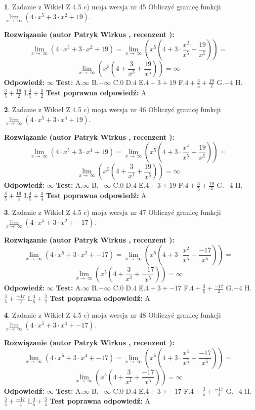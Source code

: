 \documentclass[12pt, a4paper]{article}
\theoremstyle{definition} %
\newtheorem{zad}{}
\newcommand{\zadStart}[1]{\begin{zad}#1\newline}
\newcommand{\zadStop}{\end{zad}}
\newcommand{\rozwStart}[2]{\noindent \textbf{Rozwiązanie (autor #1 , recenzent #2): }\newline}
\newcommand{\rozwStop}{\newline}
\newcommand{\odpStart}{\noindent \textbf{Odpowiedź:}\newline}
\newcommand{\odpStop}{\newline}
\newcommand{\testStart}{\noindent \textbf{Test:}\newline}
\newcommand{\testStop}{\newline}
\newcommand{\kluczStart}{\noindent \textbf{Test poprawna odpowiedź:}\newline}
\newcommand{\kluczStop}{\newline}
\begin{document}
\zadStart{Zadanie z Wikieł Z 4.5 c) moja wersja nr 45}
Obliczyć granicę funkcji  $\lim\limits_{x\to\ \infty}(4 \cdot x^{5}+3 \cdot x^{2}+19)$.
\zadStop
\rozwStart{Patryk Wirkus}{}
$$\lim\limits_{x\to\ \infty}(4 \cdot x^{5}+3 \cdot x^{2}+19) = \lim\limits_{x\to\ \infty}(x^{5}(4 +3 \cdot \frac{x^{2}}{x^{5}}+\frac{19}{x^{5}})) =$$ $$\lim\limits_{x\to\ \infty}(x^{5}(4 +\frac{3}{x^{3}}+\frac{19}{x^{5}})) =\infty$$
\rozwStop
\odpStart
$\infty$
\odpStop
\testStart
A.$\infty$ B.$-\infty$ C.$0$ D.$4$ E.$4 + 3 + 19$
F.$4+\frac{3}{5}+\frac{19}{2}$ G.$-4$
H.$\frac{3}{5}+\frac{19}{2}$
I.$\frac{4}{5}+\frac{3}{2}$
\testStop
\kluczStart
A
\kluczStop



\zadStart{Zadanie z Wikieł Z 4.5 c) moja wersja nr 46}
Obliczyć granicę funkcji  $\lim\limits_{x\to\ \infty}(4 \cdot x^{5}+3 \cdot x^{4}+19)$.
\zadStop
\rozwStart{Patryk Wirkus}{}
$$\lim\limits_{x\to\ \infty}(4 \cdot x^{5}+3 \cdot x^{4}+19) = \lim\limits_{x\to\ \infty}(x^{5}(4 +3 \cdot \frac{x^{4}}{x^{5}}+\frac{19}{x^{5}})) =$$ $$\lim\limits_{x\to\ \infty}(x^{5}(4 +\frac{3}{x^{1}}+\frac{19}{x^{5}})) =\infty$$
\rozwStop
\odpStart
$\infty$
\odpStop
\testStart
A.$\infty$ B.$-\infty$ C.$0$ D.$4$ E.$4 + 3 + 19$
F.$4+\frac{3}{5}+\frac{19}{4}$ G.$-4$
H.$\frac{3}{5}+\frac{19}{4}$
I.$\frac{4}{5}+\frac{3}{4}$
\testStop
\kluczStart
A
\kluczStop



\zadStart{Zadanie z Wikieł Z 4.5 c) moja wersja nr 47}
Obliczyć granicę funkcji  $\lim\limits_{x\to\ \infty}(4 \cdot x^{5}+3 \cdot x^{2}+-17)$.
\zadStop
\rozwStart{Patryk Wirkus}{}
$$\lim\limits_{x\to\ \infty}(4 \cdot x^{5}+3 \cdot x^{2}+-17) = \lim\limits_{x\to\ \infty}(x^{5}(4 +3 \cdot \frac{x^{2}}{x^{5}}+\frac{-17}{x^{5}})) =$$ $$\lim\limits_{x\to\ \infty}(x^{5}(4 +\frac{3}{x^{3}}+\frac{-17}{x^{5}})) =\infty$$
\rozwStop
\odpStart
$\infty$
\odpStop
\testStart
A.$\infty$ B.$-\infty$ C.$0$ D.$4$ E.$4 + 3 + -17$
F.$4+\frac{3}{5}+\frac{-17}{2}$ G.$-4$
H.$\frac{3}{5}+\frac{-17}{2}$
I.$\frac{4}{5}+\frac{3}{2}$
\testStop
\kluczStart
A
\kluczStop



\zadStart{Zadanie z Wikieł Z 4.5 c) moja wersja nr 48}
Obliczyć granicę funkcji  $\lim\limits_{x\to\ \infty}(4 \cdot x^{5}+3 \cdot x^{4}+-17)$.
\zadStop
\rozwStart{Patryk Wirkus}{}
$$\lim\limits_{x\to\ \infty}(4 \cdot x^{5}+3 \cdot x^{4}+-17) = \lim\limits_{x\to\ \infty}(x^{5}(4 +3 \cdot \frac{x^{4}}{x^{5}}+\frac{-17}{x^{5}})) =$$ $$\lim\limits_{x\to\ \infty}(x^{5}(4 +\frac{3}{x^{1}}+\frac{-17}{x^{5}})) =\infty$$
\rozwStop
\odpStart
$\infty$
\odpStop
\testStart
A.$\infty$ B.$-\infty$ C.$0$ D.$4$ E.$4 + 3 + -17$
F.$4+\frac{3}{5}+\frac{-17}{4}$ G.$-4$
H.$\frac{3}{5}+\frac{-17}{4}$
I.$\frac{4}{5}+\frac{3}{4}$
\testStop
\kluczStart
A
\kluczStop
\end{document}
